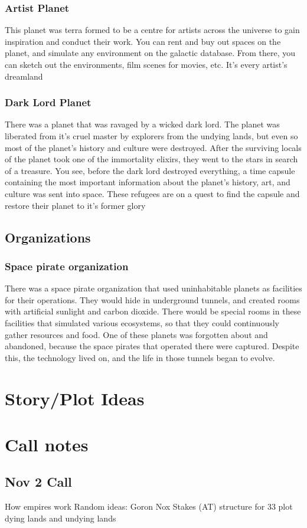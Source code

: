 \documentclass[12pt, titlepage]{article}
\begin{document}
\subsubsection{Artist Planet}

This planet was terra formed to be a centre for artists across the universe to gain inspiration and conduct their work. You can rent and buy out spaces on the planet, and simulate any environment on the galactic database. From there, you can sketch out the environments, film scenes for movies, etc. It's every artist's dreamland

\subsubsection{Dark Lord Planet}

There was a planet that was ravaged by a wicked dark lord. The planet was liberated from it's cruel master by explorers from the undying lands, but even so most of the planet's history and culture were destroyed. After the surviving locals of the planet took one of the immortality elixirs, they went to the stars in search of a treasure. You see, before the dark lord destroyed everything, a time capsule containing the most important information about the planet's history, art, and culture was sent into space. These refugees are on a quest to find the capsule and restore their planet to it's former glory


\subsection{Organizations}

\subsubsection{Space pirate organization}

There was a space pirate organization that used uninhabitable planets as facilities for their operations. They would hide in underground tunnels, and  created rooms with artificial sunlight and carbon dioxide. There would be special rooms in these facilities that simulated various ecosystems, so that they could continuously gather resources and food. One of these planets was forgotten about and abandoned, because the space pirates that operated there were captured. Despite this, the technology lived on, and the life in those tunnels began to evolve. 

\section{Story/Plot Ideas}

\section{Call notes}

\subsection{Nov 2 Call}

\begin{outline}
    \1 How empires work
    \1 Random ideas:
        \2 Goron Nox
        \2 Stakes (AT) structure for 33 plot
        \2 dying lands and undying lands
\end{outline}
\end{document}
